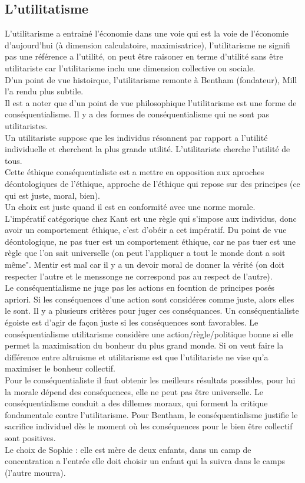 \documentclass{article}
\begin{document}
\subsection{L'utilitatisme}
L'utilitarisme a entrainé l'économie dans une voie qui est la voie de l'économie d'aujourd'hui (à
dimension calculatoire, maximisatrice), l'utilitarisme ne signifi pas une référence a l'utilité, on
peut être raisoner en terme d'utilité sans être utilitariste car l'utilitarisme inclu une dimension
collective ou sociale.\\
D'un point de vue histoirque, l'utilitarisme remonte à Bentham (fondateur), Mill l'a rendu plus
subtile. \\
Il est a noter que d'un point de vue philosophique l'utilitarisme est une forme de
conséquentialisme. Il y a des formes de conséquentialisme qui ne sont pas utilitaristes. \\
Un utilitariste suppose que les individus résonnent par rapport a l'utilité individuelle et
cherchent la plus grande utilité. L'utilitariste cherche l'utilité de tous. \\
Cette éthique conséquentialiste est a mettre en opposition aux aproches déontologiques de l'éthique,
approche de l'éthique qui repose sur des principes (ce qui est juste, moral, bien).\\
Un choix est juste quand il est en conformité avec une norme morale.\\
L'impératif catégorique chez Kant est une règle qui s'impose aux individus, donc avoir un
comportement éthique, c'est d'obéir a cet impératif. Du point de vue déontologique, ne pas tuer est
un comportement éthique, car ne pas tuer est une règle que l'on sait universelle (on peut
l'appliquer a tout le monde dont a soit même". Mentir est mal car il y a un devoir moral de donner
la vérité (on doit respecter l'autre et le menssonge ne correspond pas au respect de l'autre).\\
Le conséquentialisme ne juge pas les actions en focntion de principes posés apriori. Si les
conséquences d'une action sont considéres comme juste, alors elles le sont. Il y a plusieurs
critères pour juger ces conséquances. Un conséquentialiste égoiste est d'agir de façon juste si les
conséquences sont favorables. Le conséquentialisme utilitarisme considère une action/règle/politique bonne si elle
permet la maximisation du bonheur du plus grand monde. Si on veut faire la différence entre
altruisme et utilitarisme est que l'utilitariste ne vise qu'a maximiser le bonheur collectif.\\
Pour le conséquentialiste il faut obtenir les meilleurs résultats possibles, pour lui la morale
dépend des conséquences, elle ne peut pas être universelle. Le conséquentialisme conduit a des
dillemes moraux, qui forment la critique fondamentale contre l'utilitarisme. Pour Bentham, le
conséquentialisme justifie le sacrifice individuel dès le moment où les conséquences pour le bien
être collectif sont positives. \\
Le choix de Sophie : elle est mère de deux enfants, dans un camp de concentration a l'entrée elle
doit choisir un enfant qui la suivra dans le camps (l'autre mourra). \\
\end{document}

